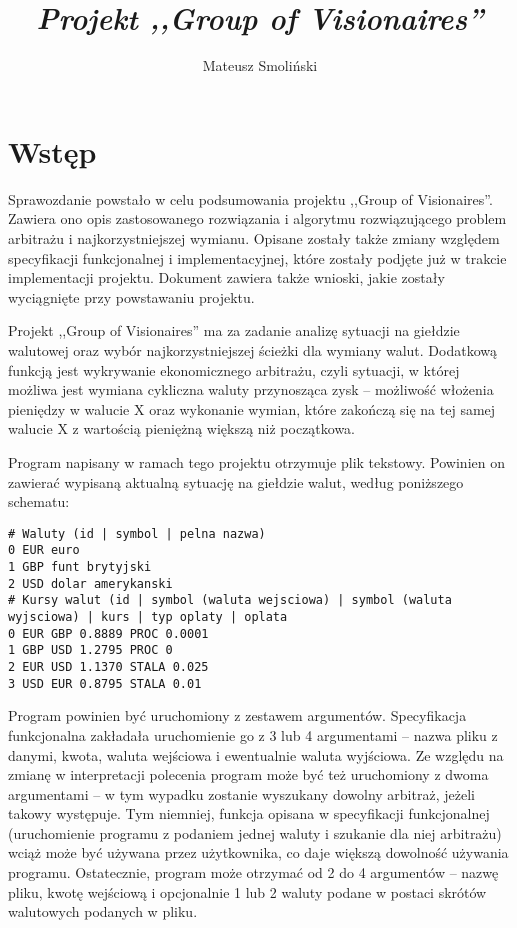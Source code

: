 \documentclass[a4paper,12pt]{article}
\title{ \sc{Sprawozdanie końcowe} \\
\emph{Projekt ,,Group of Visionaires''} }
\author{Mateusz Smoliński}
\newcommand\tab[1][0.6cm]{\hspace*{#1}}
\begin{document}
\maketitle
\thispagestyle{empty}

\tableofcontents

\newpage

\section{Wstęp}

\tab Sprawozdanie powstało w celu podsumowania projektu ,,Group of Visionaires''. Zawiera ono opis zastosowanego rozwiązania i algorytmu rozwiązującego problem arbitrażu i najkorzystniejszej wymianu. Opisane zostały także zmiany względem specyfikacji funkcjonalnej i implementacyjnej, które zostały podjęte już w trakcie implementacji projektu. Dokument zawiera także wnioski, jakie zostały wyciągnięte przy powstawaniu projektu.

Projekt ,,Group of Visionaires'' ma za zadanie analizę sytuacji na giełdzie walutowej oraz wybór najkorzystniejszej ścieżki dla wymiany walut. Dodatkową funkcją jest wykrywanie ekonomicznego arbitrażu, czyli sytuacji, w której możliwa jest wymiana cykliczna waluty przynosząca zysk -- możliwość włożenia pieniędzy w walucie X oraz wykonanie wymian, które zakończą się na tej samej walucie X z wartością pieniężną większą niż początkowa. 

Program napisany w ramach tego projektu otrzymuje plik tekstowy. Powinien on zawierać wypisaną aktualną sytuację na giełdzie walut, według poniższego schematu: 

\begin{lstlisting}
# Waluty (id | symbol | pelna nazwa)
0 EUR euro
1 GBP funt brytyjski
2 USD dolar amerykanski
# Kursy walut (id | symbol (waluta wejsciowa) | symbol (waluta 
wyjsciowa) | kurs | typ oplaty | oplata
0 EUR GBP 0.8889 PROC 0.0001
1 GBP USD 1.2795 PROC 0
2 EUR USD 1.1370 STALA 0.025
3 USD EUR 0.8795 STALA 0.01
\end{lstlisting}

Program powinien być uruchomiony z zestawem argumentów. Specyfikacja funkcjonalna zakładała uruchomienie go z 3 lub 4 argumentami -- nazwa pliku z danymi, kwota, waluta wejściowa i ewentualnie waluta wyjściowa. Ze względu na zmianę w interpretacji polecenia program może być też uruchomiony z dwoma argumentami -- w tym wypadku zostanie wyszukany dowolny arbitraż, jeżeli takowy występuje. Tym niemniej, funkcja opisana w specyfikacji funkcjonalnej (uruchomienie programu z podaniem jednej waluty i szukanie dla niej arbitrażu) wciąż może być używana przez użytkownika, co daje większą dowolność używania programu. Ostatecznie, program może otrzymać od 2 do 4 argumentów -- nazwę pliku, kwotę wejściową i opcjonalnie 1 lub 2 waluty podane w postaci skrótów walutowych podanych w pliku.
\end{document}
